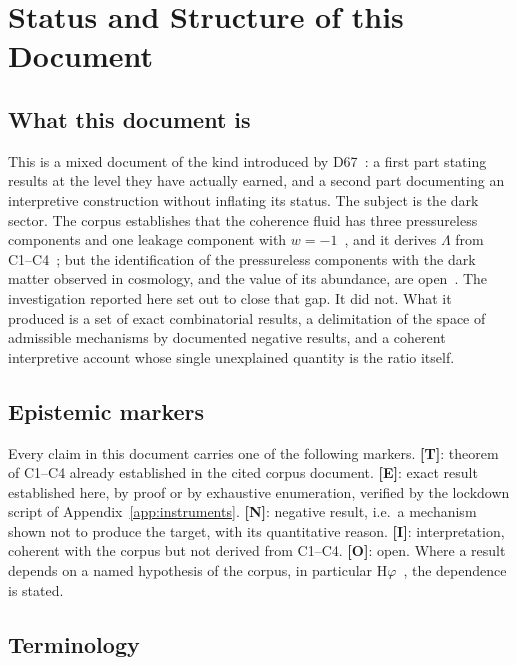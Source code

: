 \documentclass[11pt,a4paper]{article}
\theoremstyle{plain}
\theoremstyle{definition}
\theoremstyle{remark}
\newcommand{\statT}{\textbf{[T]}}
\newcommand{\statE}{\textbf{[E]}}
\newcommand{\statN}{\textbf{[N]}}
\newcommand{\statI}{\textbf{[I]}}
\newcommand{\statO}{\textbf{[O]}}
\begin{document}
\tableofcontents
\clearpage

\section{Status and Structure of this Document}
\label{sec:status}

\subsection{What this document is}

This is a mixed document of the kind introduced by D67~\citep{D67}: a first part stating results at the level they have actually earned, and a second part documenting an interpretive construction without inflating its status. The subject is the dark sector. The corpus establishes that the coherence fluid has three pressureless components and one leakage component with $w=-1$~\citep{D48,D54,D67}, and it derives $\Lambda$ from C1--C4~\citep{D51,D52,D53}; but the identification of the pressureless components with the dark matter observed in cosmology, and the value of its abundance, are open~\citep{DMv34}. The investigation reported here set out to close that gap. It did not. What it produced is a set of exact combinatorial results, a delimitation of the space of admissible mechanisms by documented negative results, and a coherent interpretive account whose single unexplained quantity is the ratio itself.

\subsection{Epistemic markers}

Every claim in this document carries one of the following markers. \statT: theorem of C1--C4 already established in the cited corpus document. \statE: exact result established here, by proof or by exhaustive enumeration, verified by the lockdown script of Appendix~\ref{app:instruments}. \statN: negative result, i.e.\ a mechanism shown not to produce the target, with its quantitative reason. \statI: interpretation, coherent with the corpus but not derived from C1--C4. \statO: open. Where a result depends on a named hypothesis of the corpus, in particular H$\varphi$~\citep{D05v2,DMv34}, the dependence is stated.

\subsection{Terminology}
\end{document}
